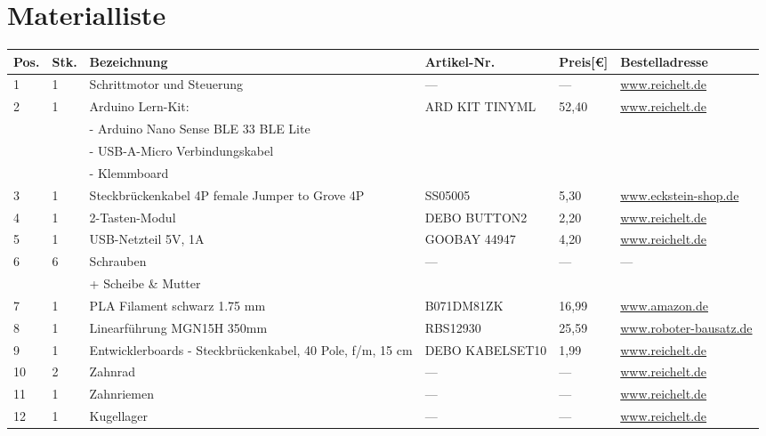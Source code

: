 \documentclass[12pt,a4paper]{scrbook}
\begin{document}
\cleardoublepage
{}




\chapter{Materialliste}
\begin{center}
	\fontsize{8}{10}\selectfont
	\begin{tabularx}{\textwidth}{|p{0.4cm}|p{0.4cm}|X|X|p{1cm}|X|}
		\hline 
		\textbf{Pos.} & \textbf{Stk.} & \textbf{Bezeichnung} & \textbf{Artikel-Nr.} & \textbf{Preis[€]} & \textbf{Bestelladresse} \\ \hline
		1 & 1 & Schrittmotor und Steuerung & --- & --- & \href{https://www.reichelt.de}{www.reichelt.de} \\
		\hline
		2 & 1 & Arduino Lern-Kit: & ARD KIT TINYML & 52,40 & \href{https://www.reichelt.de}{www.reichelt.de} \\
		&   & - Arduino Nano Sense BLE 33 BLE Lite & & & \\ 
		&   &- USB-A-Micro Verbindungskabel & & & \\
		&   &- Klemmboard & & & \\
		\hline
		3 & 1 & Steckbrückenkabel 4P female Jumper to Grove 4P & SS05005 & 5,30 & \href{https://eckstein-shop.de}{www.eckstein-shop.de} \\ 
		\hline
		4 & 1 & 2-Tasten-Modul & DEBO BUTTON2 & 2,20 & \href{https://www.reichelt.de}{www.reichelt.de} \\ 
		\hline
		5 & 1 & USB-Netzteil 5V, 1A & GOOBAY 44947 & 4,20 & \href{https://www.reichelt.de}{www.reichelt.de} \\ 
		\hline
		6 & 6 & Schrauben & --- & --- &	--- \\ 
		&   & + Scheibe \& Mutter & & \\
		\hline
		7 & 1 & PLA Filament  schwarz 1.75 mm  & B071DM81ZK & 16,99 & \href{https://wwww.amazon.de}{www.amazon.de} \\ 
		\hline
		8 & 1 & Linearführung MGN15H 350mm & RBS12930 & 25,59 & \href{https://www.roboter-bausatz.de}{www.roboter-bausatz.de} \\
		\hline
		9 & 1 & Entwicklerboards - Steckbrückenkabel, 40 Pole, f/m, 15 cm & DEBO KABELSET10 & 1,99 &
		\href{https://wwww.reichelt.de}{www.reichelt.de} \\
		\hline
		10 & 2 & Zahnrad & --- & --- &
		\href{https://wwww.reichelt.de}{www.reichelt.de} \\
		\hline
		11 & 1 & Zahnriemen & --- & --- &
		\href{https://wwww.reichelt.de}{www.reichelt.de} \\
		\hline
		12 & 1 & Kugellager & --- & --- &
		\href{https://wwww.reichelt.de}{www.reichelt.de} \\
		\hline
	\end{tabularx}
	
\end{center}
\end{document}

